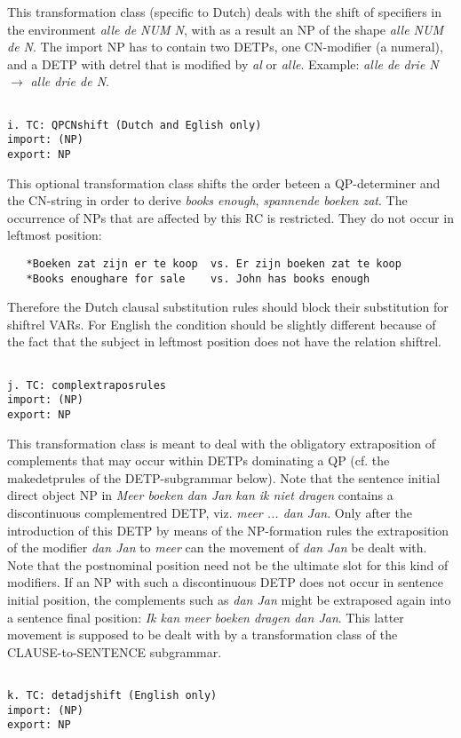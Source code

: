 This transformation class (specific to Dutch) deals with the shift of
specifiers in the environment {\em alle de NUM N}, with as a result an NP of
the shape {\em alle NUM de N}. The import NP has to contain two DETPs, one
CN-modifier (a numeral), and a DETP with detrel that is modified by {\em al} or
{\em alle}. Example: {\em alle de drie N} $\rightarrow$ {\em alle drie de N}.
\begin{verbatim}

i. TC: QPCNshift (Dutch and Eglish only)
import: (NP)
export: NP
\end{verbatim}
This optional transformation class shifts the order beteen a QP-determiner and
the CN-string in order to derive {\em books enough}, {\em spannende boeken zat}.
The occurrence of NPs that are affected by this RC 
is restricted. They do not
occur in leftmost position:
\begin{verbatim}
   *Boeken zat zijn er te koop  vs. Er zijn boeken zat te koop
   *Books enoughare for sale    vs. John has books enough
\end{verbatim}
Therefore the Dutch clausal substitution rules 
should block their substitution for shiftrel VARs. For English the condition 
should be slightly different because of the fact that the subject in leftmost 
position does not have the relation shiftrel.
\begin{verbatim}

j. TC: complextraposrules
import: (NP)
export: NP
\end{verbatim}
This transformation class is meant to deal with the obligatory extraposition of
complements that may occur within DETPs dominating a QP (cf. the makedetprules
of the DETP-subgrammar below). Note that the sentence initial direct object NP
in {\em Meer boeken dan Jan kan ik niet dragen} contains a discontinuous
complementred DETP, viz. {\em meer ... dan Jan}. Only after the introduction of
this DETP by means of the NP-formation rules the extraposition of the modifier
{\em dan Jan} to {\em meer} can the movement of {\em dan Jan} be dealt with.
Note that the postnominal position need not be the ultimate slot for this kind
of modifiers. If an NP with such a discontinuous DETP does not occur in
sentence initial position, the complements such as {\em dan Jan} might be
extraposed again into a sentence final position: {\em Ik kan meer boeken dragen
dan Jan}. This latter movement is supposed to be dealt with by a transformation
class of the CLAUSE-to-SENTENCE subgrammar. 
\begin{verbatim}

k. TC: detadjshift (English only)
import: (NP)
export: NP
\end{verbatim}
